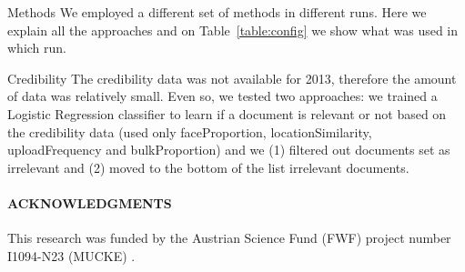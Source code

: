 \documentclass{acm_proc_article-me}
\begin{document}



\begin{section}{Methods}
We employed a different set of methods in different runs. 
Here we explain all the approaches and on Table~\ref{table:config} we show what was used in which run.




\begin{subsection}{Credibility}
The credibility data was not available for 2013, therefore the amount of data was relatively small. 
Even so, we tested two approaches: we trained a Logistic Regression classifier to learn if a document is relevant or not based on the credibility data (used only faceProportion, locationSimilarity, uploadFrequency and bulkProportion) and we (1) filtered out documents set as irrelevant and (2) moved to the bottom of the list irrelevant documents.
\end{subsection}
\end{section}




\paragraph{\textbf{ACKNOWLEDGMENTS}}
This research was funded by the Austrian Science Fund (FWF) project number I1094-N23 (MUCKE) .


  
\end{document}
